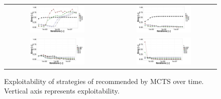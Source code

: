 \begin{figure}[t]
\begin{tabular}{cc}
\hspace{-1cm}\includegraphics[width=0.55\textwidth]{figures/brps-MCTS-UCT.pdf} & \includegraphics[width=0.55\textwidth]{figures/brps-MCTS-UCT-NONDET.pdf}\\
\hspace{-1cm}\includegraphics[width=0.55\textwidth]{figures/brps-MCTS-EXP3.pdf} & \includegraphics[width=0.55\textwidth]{figures/brps-MCTS-RM.pdf}
\end{tabular}
\caption{Exploitability of strategies of recommended by MCTS over time. Vertical axis represents exploitability. \label{fig:expl-brps}}
\end{figure}

